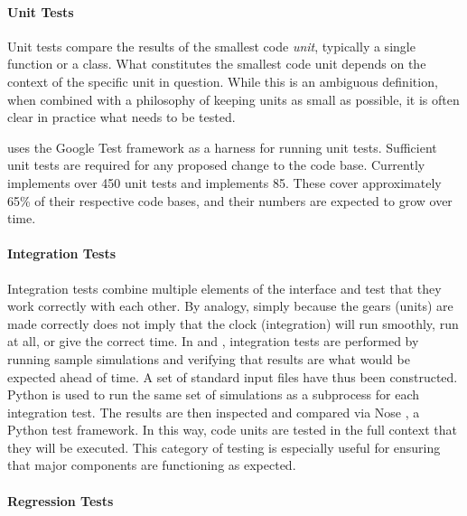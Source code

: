 \paragraph{Unit Tests}

Unit tests compare the results of the smallest code \emph{unit}, 
typically a single function or a class. What constitutes the smallest code
unit depends on the context of the specific unit in question. While this is 
an ambiguous definition, when combined with a philosophy of keeping units as small
as possible, it is often clear in practice what needs to be tested.

\Cyclus uses the Google Test framework \cite{inc_googletest_2008} as a harness for running unit 
tests. Sufficient unit tests are required for any proposed change to the \Cyclus
code base. Currently \Cyclus implements over 450 unit tests and \Cycamore implements 
85.  These cover approximately 65\% of their respective code bases, and their numbers are expected to grow over time. 

\paragraph{Integration Tests} 

Integration tests combine multiple elements of the 
\Cyclus interface and test that they work correctly with each other.  By analogy, 
simply because the gears (units) are made correctly does not imply that the 
clock (integration) will run smoothly, run at all, or give the correct time.
In \Cyclus and \Cycamore, integration tests are performed by running sample
simulations and verifying that results are what would be expected ahead of 
time. A set of standard input files have thus been constructed. 
Python is used to run the same set of \Cyclus simulations as a subprocess for each integration test.  The results are then inspected and compared via Nose \cite{pellerin_nose_2007}, a Python test framework.
In this way, \Cyclus code units are tested in the full context that they will be
executed. This category of testing is especially useful for ensuring that 
major \Cyclus components are functioning as expected.

\paragraph{Regression Tests}

